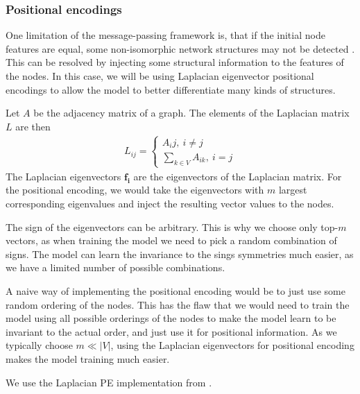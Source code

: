 \documentclass[english, 12pt, a4paper, sci, utf8, a-2b, online]{aaltothesis}
\begin{document}
\subsubsection{Positional encodings}

One limitation of the message-passing framework is, that if the initial node features are equal, some non-isomorphic network structures may not be detected \cite{repr-limit-2020}. This can be resolved by injecting some structural information to the features of the nodes. In this case, we will be using Laplacian eigenvector positional encodings \cite{LaPE-first-introduction-2003} to allow the model to better differentiate many kinds of structures.

Let $A$ be the adjacency matrix of a graph. The elements of the Laplacian matrix $L$ are then
\begin{align}
    L_{ij} = \begin{cases}
        A_ij,\ i \neq j\\
        \sum_{k \in V} A_{ik},\ i = j
    \end{cases}
\end{align}
The Laplacian eigenvectors $\mathbf{f_i}$ are the eigenvectors of the Laplacian matrix. For the positional encoding, we would take the eigenvectors with $m$ largest corresponding eigenvalues and inject the resulting vector values to the nodes.

The sign of the eigenvectors can be arbitrary. This is why we choose only top-$m$ vectors, as when training the model we need to pick a random combination of signs. The model can learn the invariance to the sings symmetries much easier, as we have a limited number of possible combinations.

A naive way of implementing the positional encoding would be to just use some random ordering of the nodes. This has the flaw that we would need to train the model using all possible orderings of the nodes to make the model learn to be invariant to the actual order, and just use it for positional information. As we typically choose $m \ll |V|$, using the Laplacian eigenvectors for positional encoding makes the model training much easier.

We use the Laplacian PE implementation from \cite{LaPE-implementation-2020}.



\end{document}
